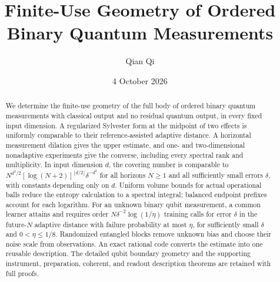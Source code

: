 \documentclass[11pt]{amsart}
\title[Finite-use measurement geometry]{Finite-Use Geometry of Ordered Binary Quantum Measurements}
\author{Qian Qi}
\date{4 October 2026}
\numberwithin{equation}{section}
\theoremstyle{definition}\newtheorem{definition}[theorem]{Definition}
\theoremstyle{remark}\newtheorem{remark}[theorem]{Remark}
\begin{document}
\raggedbottom
\begin{abstract}
We determine the finite-use geometry of the full body of ordered binary
quantum measurements with classical output and no residual quantum
output, in every fixed input dimension. A regularized
Sylvester form at the midpoint of two effects is uniformly comparable
to their reference-assisted adaptive distance. A horizontal measurement
dilation gives the upper estimate, and one- and two-dimensional
nonadaptive experiments give the converse, including every spectral
rank and multiplicity. In input dimension $d$, the covering number is
comparable to
\mbox{$N^{d^2/2}[\log(N+2)]^{\lfloor d/2\rfloor}\delta^{-d^2}$}
for all horizons $N\ge1$ and all sufficiently small errors $\delta$,
with constants depending only on $d$. Uniform volume bounds for actual
operational balls reduce the entropy calculation to a spectral integral;
balanced endpoint prefixes account for each logarithm.
For an unknown binary qubit measurement, a common learner attains and
requires order $N\delta^{-2}\log(1/\eta)$ training calls for error
$\delta$ in the future-$N$ adaptive distance with failure probability
at most $\eta$, for sufficiently small $\delta$ and
$0<\eta\le1/8$. Randomized entangled blocks remove unknown bias and
choose their noise scale from observations. An exact rational code
converts the estimate into one reusable description. The detailed
qubit boundary geometry and the supporting instrument, preparation,
coherent, and readout description theorems are retained with full proofs.
\end{abstract}
\maketitle








\appendix















\end{document}
